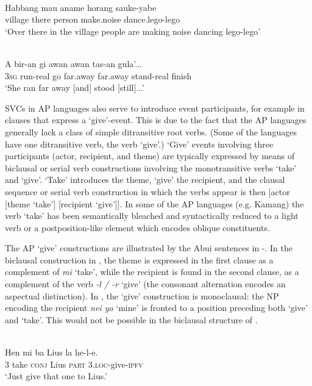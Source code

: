 {\ea%
\label{ex:1:26}
\\
\gll Habbang  mau  aname  horang  sauke-yabe \\
village  there  person  make.noise  dance.lego-lego   \\
\glt `Over there in the village people are making noise dancing lego-lego'
\z
 


\ea%
\label{ex:1:27}
 \\
\gll A   bir-an  gi  awan  awan  tas-an  gula'... \\
 3\textsc{sg}  run-real   go  far.away  far.away  stand-real  finish  \\
\glt `She ran far away [and] stood [still]...'  
\z
 

SVCs in AP languages also serve to introduce event participants, for example in clauses that express a `give'-event. This is due to the fact that the AP languages generally lack a class of simple ditransitive root verbs. (Some of the languages have one ditransitive verb, the verb `give'.) `Give' events involving three participants (actor, recipient, and theme) are typically expressed by means of biclausal or serial verb constructions involving the monotransitive verbs `take' and `give'. `Take' introduces the theme, `give' the recipient, and the clausal sequence or serial verb construction in which the verbs appear is then [actor [theme `take'] [recipient `give']]. In some of the AP languages (e.g. Kamang) the verb `take' has been semantically bleached and syntactically reduced to a light verb or a postposition-like element which encodes oblique constituents.

The AP `give' constructions are illustrated by the Abui sentences in -. In the biclausal construction in , the theme is expressed in the first clause as a complement of \textit{mi} `take', while the recipient is found in the second clause, as a complement of the verb \textit{{}-l / -r} `give' (the consonant alternation encodes an aspectual distinction). In , the `give' construction is monoclausal: the NP encoding the recipient \textit{nei yo} `mine' is fronted to a position preceding both `give' and `take'. This would not be possible in the biclausal structure of .



\ea%
\label{ex:1:28}
   \\
\gll Hen  mi  ba  Lius  la   he-l-e. \\
3  take  \textsc{conj} Lius  \textsc{part} 3.\textsc{loc}{}-give-\textsc{ipfv}   \\
\glt `Just give that one to Lius.' 
\z









}
